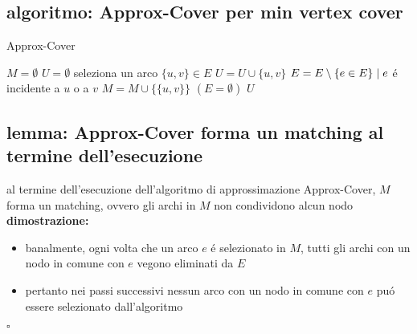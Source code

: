 
\subsection*{algoritmo: Approx-Cover per min vertex cover}
\begin{flushleft}
	\begin{algorithm}
		\caption{Approx-Cover}
		\begin{algorithmic}
			\STATE $M=\emptyset$
			\STATE $U=\emptyset$
			\REPEAT
				\STATE seleziona un arco $\{u,v\}\in E$
				\STATE $U=U\cup\{u,v\}$
				\STATE $E=E\setminus\{e\in E\}\hspace{0.1cm}\vert\hspace{0.1cm}e$ \'e incidente a $u$ o a $v$
				\STATE $M=M\cup\{\{u,v\}\}$
			\UNTIL $(E=\emptyset)$
			\RETURN $U$
		\end{algorithmic}
	\end{algorithm}
\end{flushleft}


\subsection*{lemma: Approx-Cover forma un matching al termine dell'esecuzione}
\begin{flushleft}
	al termine dell'esecuzione dell'algoritmo di approssimazione Approx-Cover, $M$ forma un matching, ovvero gli archi in $M$ non condividono alcun nodo \newline \\
	\textbf{dimostrazione:}
	\begin{itemize}
		\item banalmente, ogni volta che un arco $e$ \'e selezionato in $M$, tutti gli archi con un nodo in comune con $e$ vegono eliminati da $E$
		\item pertanto nei passi successivi nessun arco con un nodo in comune con $e$ pu\'o essere selezionato dall'algoritmo
	\end{itemize}
	\hfill$\square$
\end{flushleft}


